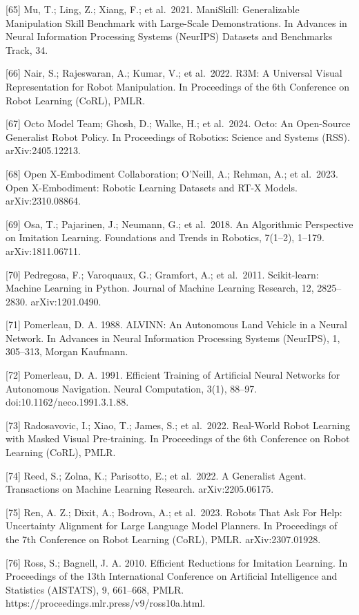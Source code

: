 \documentclass[
  11pt,
]{article}
\begin{document}
{[}65{]} Mu, T.; Ling, Z.; Xiang, F.; et al.~2021. ManiSkill:
Generalizable Manipulation Skill Benchmark with Large-Scale
Demonstrations. In Advances in Neural Information Processing Systems
(NeurIPS) Datasets and Benchmarks Track, 34.

{[}66{]} Nair, S.; Rajeswaran, A.; Kumar, V.; et al.~2022. R3M: A
Universal Visual Representation for Robot Manipulation. In Proceedings
of the 6th Conference on Robot Learning (CoRL), PMLR.

{[}67{]} Octo Model Team; Ghosh, D.; Walke, H.; et al.~2024. Octo: An
Open-Source Generalist Robot Policy. In Proceedings of Robotics: Science
and Systems (RSS). arXiv:2405.12213.

{[}68{]} Open X-Embodiment Collaboration; O'Neill, A.; Rehman, A.; et
al.~2023. Open X-Embodiment: Robotic Learning Datasets and RT-X Models.
arXiv:2310.08864.

{[}69{]} Osa, T.; Pajarinen, J.; Neumann, G.; et al.~2018. An
Algorithmic Perspective on Imitation Learning. Foundations and Trends in
Robotics, 7(1--2), 1--179. arXiv:1811.06711.

{[}70{]} Pedregosa, F.; Varoquaux, G.; Gramfort, A.; et al.~2011.
Scikit-learn: Machine Learning in Python. Journal of Machine Learning
Research, 12, 2825--2830. arXiv:1201.0490.

{[}71{]} Pomerleau, D. A. 1988. ALVINN: An Autonomous Land Vehicle in a
Neural Network. In Advances in Neural Information Processing Systems
(NeurIPS), 1, 305--313, Morgan Kaufmann.

{[}72{]} Pomerleau, D. A. 1991. Efficient Training of Artificial Neural
Networks for Autonomous Navigation. Neural Computation, 3(1), 88--97.
doi:10.1162/neco.1991.3.1.88.

{[}73{]} Radosavovic, I.; Xiao, T.; James, S.; et al.~2022. Real-World
Robot Learning with Masked Visual Pre-training. In Proceedings of the
6th Conference on Robot Learning (CoRL), PMLR.

{[}74{]} Reed, S.; Zolna, K.; Parisotto, E.; et al.~2022. A Generalist
Agent. Transactions on Machine Learning Research. arXiv:2205.06175.

{[}75{]} Ren, A. Z.; Dixit, A.; Bodrova, A.; et al.~2023. Robots That
Ask For Help: Uncertainty Alignment for Large Language Model Planners.
In Proceedings of the 7th Conference on Robot Learning (CoRL), PMLR.
arXiv:2307.01928.

{[}76{]} Ross, S.; Bagnell, J. A. 2010. Efficient Reductions for
Imitation Learning. In Proceedings of the 13th International Conference
on Artificial Intelligence and Statistics (AISTATS), 9, 661--668, PMLR.
https://proceedings.mlr.press/v9/ross10a.html.
\end{document}
